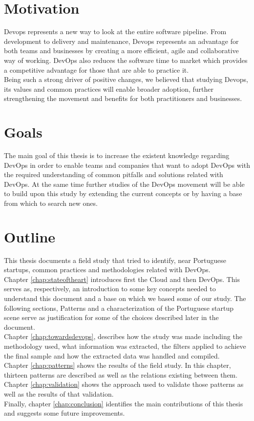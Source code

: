 		\section{Motivation} \label{chap:introduction:sec:motivation}
		Devops represents a new way to look at the entire software pipeline. From development to delivery and maintenance, Devops represents an advantage for both teams and businesses by creating a more efficient, agile and collaborative way of working. DevOps also reduces the software time to market which provides a competitive advantage for those that are able to practice it.\\
		Being such a strong driver of positive changes, we believed that studying Devops, its values and common practices will enable broader adoption, further strengthening the movement and benefits for both practitioners and businesses.

		\section{Goals}
		The main goal of this thesis is to increase the existent knowledge regarding DevOps in order to enable teams and companies that want to adopt DevOps with the required understanding of common pitfalls and solutions related with DevOps. At the same time further studies of the DevOps movement will be able to build upon this study by extending the current concepts or by having a base from which to search new ones.

  	\section{Outline} \label{chap:introduction:sec:outline}
		This thesis documents a field study that tried to identify, near Portuguese startups, common practices and methodologies related with DevOps. \\
		Chapter \ref{chap:stateoftheart} introduces first the Cloud and then DevOps. This serves as, respectively, an introduction to some key concepts needed to understand this document and a base on which we based some of our study. The following sections, Patterns and a characterization of the Portuguese startup scene serve as justification for some of the choices described later in the document. \\
		Chapter \ref{chap:towardsdevops}, describes how the study was made including the methodology used, what information was extracted, the filters applied to achieve the final sample and how the extracted data was handled and compiled. \\
		Chapter \ref{chap:patterns} shows the results of the field study. In this chapter, thirteen patterns are described as well as the relations existing between them.\\
		Chapter \ref{chap:validation} shows the approach used to validate those patterns as well as the results of that validation.\\
		Finally, chapter \ref{chap:conclusion} identifies the main contributions of this thesis and suggests some future improvements.
